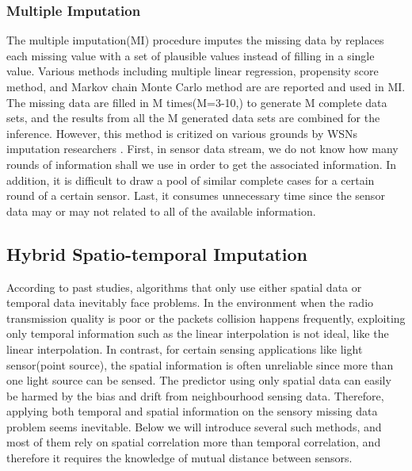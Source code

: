 \subsubsection{Multiple Imputation}
The multiple imputation(MI) procedure\cite{Little:hotdeck} imputes the missing data by replaces each missing value with a set of plausible values instead of filling in a single value. Various methods including multiple linear regression, propensity score method, and Markov chain Monte Carlo method are are reported and used in MI. The missing data are filled in M times(M=3-10,\cite{Little:hotdeck}) to generate M complete data sets, and the results from all the M generated data sets are combined for the inference\cite{yuan2000multiple}. 
However, this method is critized on various grounds by WSNs imputation researchers\cite{jiang2007estimating} \cite{Gruenwald:FARM}. First, in sensor data stream, we do not know how many rounds of information shall we use in order to get the associated information.
In addition, it is difficult to draw a pool of similar complete cases for a certain round of a certain sensor. 
Last, it consumes unnecessary time since the sensor data may or may not related to all of the available information.



\subsection{Hybrid Spatio-temporal Imputation}    
According to past studies, algorithms that only use either spatial data or temporal data inevitably face problems\cite{Lim:robust}. In the environment when the radio transmission quality is poor or the packets collision happens frequently, exploiting only temporal information such as the linear interpolation is not ideal, like the linear interpolation. In contrast, for certain sensing applications like light sensor(point source), the spatial information is often unreliable since more than one light source can be sensed. The predictor using only spatial data can easily be harmed by the bias and drift from neighbourhood sensing data. Therefore, applying both temporal and spatial information on the sensory missing data problem seems inevitable. 
Below we will introduce several such methods, and most of them rely on spatial correlation more than temporal correlation, and therefore it requires the knowledge of mutual distance between sensors.     
